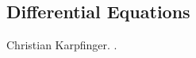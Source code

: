\documentclass[12pt]{article}
\begin{document}
\subsection{Differential Equations}





\begin{thebibliography}{10}
Christian Karpfinger. .
\end{thebibliography}	

 
  
	
\end{document}
